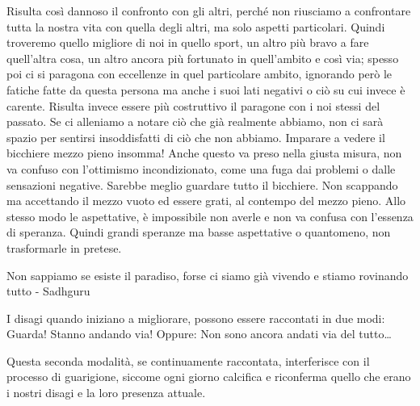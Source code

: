 \documentclass[12pt]{book} %
\begin{document}
Risulta così dannoso il confronto con gli altri, perché non riusciamo a confrontare tutta la nostra vita con quella
degli altri, ma solo aspetti particolari. Quindi troveremo quello migliore di noi in quello sport, un altro più bravo a
fare quell'altra cosa, un altro ancora più fortunato in quell'ambito e così
via; spesso poi ci si paragona con eccellenze in quel particolare ambito, ignorando però le fatiche fatte da questa persona ma anche i suoi lati negativi o ciò su cui invece è carente. Risulta invece essere più costruttivo il paragone
con i noi stessi del passato. 
Se ci alleniamo a notare ciò che già realmente abbiamo, non ci sarà spazio per sentirsi
insoddisfatti di ciò che non abbiamo. Imparare a vedere il bicchiere mezzo pieno insomma! 
Anche questo va preso nella giusta misura, non va confuso con l'ottimismo
incondizionato, come una fuga dai problemi o dalle sensazioni negative. Sarebbe meglio guardare tutto il bicchiere. Non
scappando ma accettando il mezzo vuoto ed essere grati, al contempo del mezzo pieno. Allo stesso modo le aspettative, è
impossibile non averle e non va confusa con l'essenza di speranza. Quindi grandi speranze ma basse
aspettative o quantomeno, non trasformarle in pretese.

Non sappiamo se esiste il paradiso, forse ci siamo già vivendo e stiamo rovinando tutto - Sadhguru

I disagi quando iniziano a migliorare, possono essere raccontati in due modi:
Guarda! Stanno andando via!
Oppure:
Non sono ancora andati via del tutto…

Questa seconda modalità, se continuamente raccontata, interferisce con il processo di guarigione, siccome ogni giorno
calcifica e riconferma quello che erano i nostri disagi e la loro presenza attuale.
\end{document}
